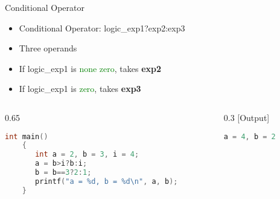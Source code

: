 \begin{frame}[fragile]{Conditional Operator}
\begin{itemize}
	\item {Conditional Operator: logic\_exp1?exp2:exp3}
	\item {Three operands}
	\item {If logic\_exp1 is \textcolor{green}{none zero}, takes \textbf{exp2}}
	\item {If logic\_exp1 is \textcolor{green}{zero}, takes \textbf{exp3}}
\end{itemize}
\begin{columns}
\begin{column}{0.65\linewidth}
	\begin{lstlisting}[numbers=none, language=c, rulecolor=\color{blue}]
	int main()
	{
	   int a = 2, b = 3, i = 4;
	   a = b>i?b:i;
	   b = b==3?2:1;
	   printf("a = %d, b = %d\n", a, b);
	}
	\end{lstlisting}
\end{column}
\begin{column}{0.3\linewidth}
[Output]
	\begin{lstlisting}[numbers=none, language=c, rulecolor=\color{blue}]
	a = 4, b = 2
	\end{lstlisting}
\end{column}
\end{columns}
\end{frame}